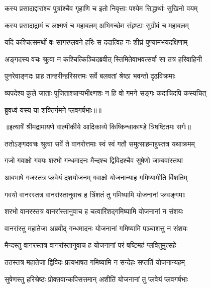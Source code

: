 \twolineshloka
{कस्य प्रसादाद्दारांश्च पुत्रांश्चैव गृहाणि च}
{इतो निवृत्ताः पश्येम सिद्धार्थाः सुखिनो वयम्} %

\twolineshloka
{कस्य प्रसादाद्रामं च लक्ष्मणं च महाबलम्}
{अभिगच्छेम संहृष्टाः सुग्रीवं च महाबलम्} %

\twolineshloka
{यदि कश्चित्समर्थो वः सागरप्लवने हरिः}
{स ददात्विह नः शीघ्रं पुण्यामभयदक्षिणाम्} %

\twolineshloka
{अङ्गदस्य वचः श्रुत्वा न कश्चित्किञ्चिदब्रवीत्}
{स्तिमितेवाभवत्सर्वा सा तत्र हरिवाहिनी} %

\twolineshloka
{पुनरेवाङ्गदः प्राह तान्हरीन्हरिसत्तमः}
{सर्वे बलवतां श्रेष्ठा भवन्तो दृढविक्रमाः} %

\twolineshloka
{व्यपदेश्य कुले जाताः पूजिताश्चाप्यभीक्ष्णशः}
{न हि वो गमने सङ्गः कदाचिदपि कस्यचित्} %

{ब्रुवध्वं यस्य या शक्तिर्गमने प्लवगर्षभाः॥॥} %

\addtocounter{shlokacount}{1}


{॥इत्यार्षे श्रीमद्रामायणे वाल्मीकीये आदिकाव्ये किष्किन्धाकाण्डे त्रिषष्टितमः सर्गः॥}


\twolineshloka
{ततोऽङ्गदवचः श्रुत्वा सर्वे ते वानरोत्तमाः}
{स्वं स्वं गतौ समुत्साहमाहुस्तत्र यथाक्रमम्} %

\twolineshloka
{गजो गवाक्षो गवयः शरभो गन्धमादनः}
{मैन्दश्च द्विविदश्चैव सुषेणो जाम्बवांस्तथा} %

\twolineshloka
{आबभाषे गजस्तत्र प्लवेयं दशयोजनम्}
{गवाक्षो योजनान्याह गमिष्यामीति विंशतिम्} %

\twolineshloka
{गवयो वानरस्तत्र वानरांस्तानुवाच ह}
{त्रिंशतं तु गमिष्यामि योजनानां प्लवङ्गमाः} %

\twolineshloka
{शरभो वानरस्तत्र वानरांस्तानुवाच ह}
{चत्वारिंशद्गमिष्यामि योजनानां न संशयः} %

\twolineshloka
{वानरांस्तु महातेजा अब्रवीद् गन्धमादनः}
{योजनानां गमिष्यामि पञ्चाशत्तु न संशयः} %

\twolineshloka
{मैन्दस्तु वानरस्तत्र वानरांस्तानुवाच ह}
{योजनानां परं षष्टिमहं प्लवितुमुत्सहे} %

\twolineshloka
{ततस्तत्र महातेजा द्विविदः प्रत्यभाषत}
{गमिष्यामि न सन्देहः सप्ततिं योजनान्यहम्} %

\twolineshloka
{सुषेणस्तु हरिश्रेष्ठः प्रोक्तवान्कपिसत्तमान्}
{अशीतिं योजनानां तु प्लवेयं प्लवगर्षभाः} %

